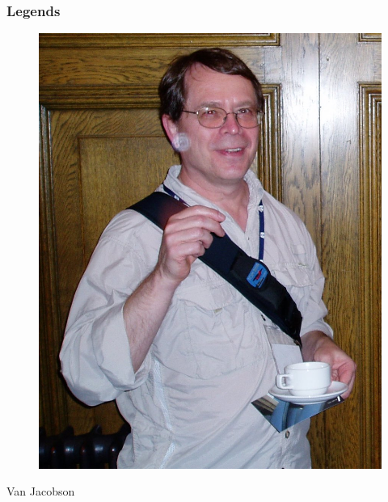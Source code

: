 \documentclass{../c-lecture}
\begin{document}
\begin{frame}
  \frametitle{Legends}
  \begin{figure}
    \includegraphics[height=.75\textheight]{./img/van.jpg}
  \end{figure}
  \pause%
  \centering
  \color{Violet} Van Jacobson
\end{frame}
\end{document}
